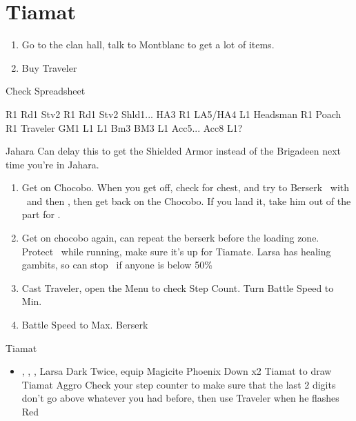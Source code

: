 \chapter{Tiamat}

\begin{enumerate}
	\item Go to the clan hall, talk to Montblanc to get a lot of items.
	\item Buy Traveler
\end{enumerate}
\begin{liscense}
	Check Spreadsheet

	R1	Rd1
	Stv2
	R1	Rd1
	Stv2
	Shld1... HA3					R1
	LA5/HA4
	L1					Headsman
	R1	Poach				R1
	Traveler
	GM1
	L1	L1				Bm3
	BM3	L1
	Acc5... Acc8	L1?
\end{liscense}

\begin{shop}{Jahara}
	Can delay this to get the Shielded Armor instead of the Brigadeen next time you're in Jahara.
\end{shop}
\begin{enumerate}
	\item Get on Chocobo. When you get off, check for chest, and try to Berserk \basch\ with \penelo\ and then \vaan, then get back on the Chocobo. If you land it, take him out of the part for \balthier.
	\item Get on chocobo again, can repeat the berserk before the loading zone.
	      \vaanf Protect \vaan\ while running, make sure it's up for Tiamate. Larsa has healing gambits, so can stop \flee\ if anyone is below 50\%
	\item Cast Traveler, open the Menu to check Step Count. Turn Battle Speed to Min.
	\item Battle Speed to Max. Berserk \basch
\end{enumerate}
\begin{battle}{Tiamat}
	\begin{itemize}
		\item \vaan, \balthier, \basch, Larsa
		      \vaanf Dark Twice, equip Magicite
		      \vaanf Phoenix Down x2 Tiamat to draw Tiamat Aggro
		      \balthierf Check your step counter to make sure that the last 2 digits don't go above whatever you had before, then use Traveler when he flashes Red
	\end{itemize}
\end{battle}